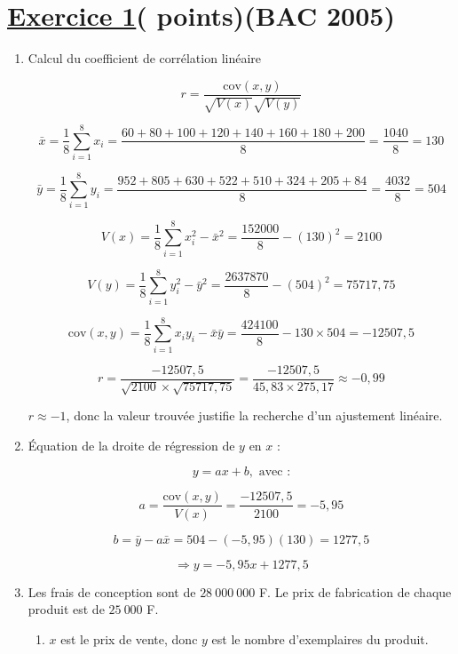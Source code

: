 \documentclass[12pt,a4paper]{article}
\begin{document}
\section*{\underline{Exercice 1}( points)(BAC 2005)}
\begin{enumerate}
    \item Calcul du coefficient de corrélation linéaire

\[
r = \frac{\text{cov}(x, y)}{\sqrt{V(x)} \sqrt{V(y)}}
\]

\[
\bar{x} = \frac{1}{8} \sum_{i=1}^{8} x_i = \frac{60 + 80 + 100 + 120 + 140 + 160 + 180 + 200}{8} = \frac{1040}{8} = 130
\]

\[
\bar{y} = \frac{1}{8} \sum_{i=1}^{8} y_i = \frac{952 + 805 + 630 + 522 + 510 + 324 + 205 + 84}{8} = \frac{4032}{8} = 504
\]

\[
V(x) = \frac{1}{8} \sum_{i=1}^{8} x_i^2 - \bar{x}^2 = \frac{152000}{8} - (130)^2 = 2100
\]

\[
V(y) = \frac{1}{8} \sum_{i=1}^{8} y_i^2 - \bar{y}^2 = \frac{2637870}{8} - (504)^2 = 75717{,}75
\]

\[
\text{cov}(x, y) = \frac{1}{8} \sum_{i=1}^{8} x_i y_i - \bar{x} \bar{y} = \frac{424100}{8} - 130 \times 504 = -12507{,}5
\]

\[
r = \frac{-12507{,}5}{\sqrt{2100} \times \sqrt{75717{,}75}} = \frac{-12507{,}5}{45{,}83 \times 275{,}17} \approx -0{,}99
\]

\vspace{0.2cm}
$r\approx -1$, donc la valeur trouvée justifie la recherche d’un ajustement linéaire.

\item Équation de la droite de régression de \( y \) en \( x \) :

\[
y = ax + b, \text{ avec :}
\]

\[
a = \frac{\text{cov}(x, y)}{V(x)} = \frac{-12507{,}5}{2100} = -5{,}95
\]

\[
b = \bar{y} - a \bar{x} = 504 - (-5{,}95)(130) = 1277{,}5
\]

\[
\Rightarrow y = -5{,}95x + 1277{,}5
\]

\vspace{0.5cm}
\item  Les frais de conception sont de \( 28~000~000 \) F. Le prix de fabrication de chaque produit est de \( 25~000 \) F.

\begin{enumerate}
		\item \( x \) est le prix de vente, donc \( y \) est le nombre d'exemplaires du produit.


\end{enumerate}
\end{enumerate}
\end{document}
